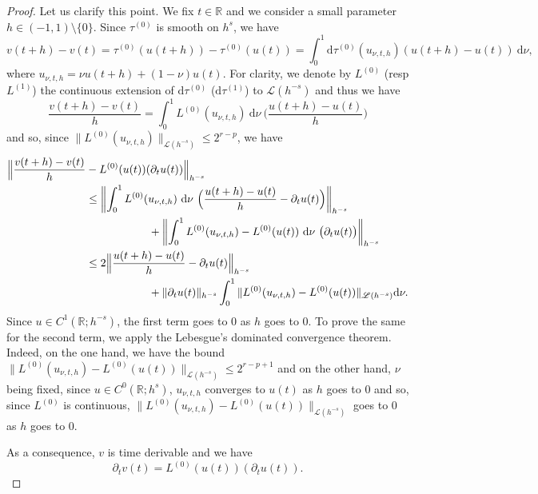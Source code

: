 \documentclass[JEP,XML,SOM,Unicode,NoEqCountersInSection,published]{cedram}
\theoremstyle{definition}
\begin{document}
\begin{proof}
Let us clarify this point. We fix $t\in \mathbb{R}$ and we consider a small parameter $h\in (-1,1)\setminus \{0\}$.
Since $\tau^{(0)}$ is smooth on $h^s$, we have\vspace*{-3pt}
\[
v(t+h)-v(t) = \tau^{(0)}(u(t+h)) - \tau^{(0)}(u(t)) = \int_0^1 \mathrm{d}\tau^{(0)}(u_{\nu,t,h})(u(t+h) - u(t)) \ \mathrm{d}\nu,
\]
where $u_{\nu,t,h} = \nu u(t+h) +(1-\nu) u(t)$. For clarity, we denote by $L^{(0)}$ (resp $L^{(1)}$) the continuous extension of $\mathrm{d}\tau^{(0)}$ (\resp $\mathrm{d}\tau^{(1)}$) to $\mathscr{L}(h^{-s})$ and thus we have\vspace*{-3pt}
\[
\frac{v(t+h)-v(t)}h = \int_0^1 L^{(0)}(u_{\nu,t,h}) \ \mathrm{d}\nu \ \Big(\frac{u(t+h) - u(t)}{h}\Big)
\]
and so, since $ \| L^{(0)}(u_{\nu,t,h}) \|_{\mathscr{L}(h^{-s})}\leq 2^{r-p}$, we have\vspace*{-3pt}
\begin{equation*}
\begin{split}
\Bigl\| \frac{v(t+h)-v(t)}h &- L^{(0)}(u(t))(\partial_t u(t)) \Bigl\|_{h^{-s}} \\
&\leq \biggl\| \int_0^1 L^{(0)}(u_{\nu,t,h}) \ \mathrm{d}\nu \ \Big(\frac{u(t+h) - u(t)}{h} -\partial_t u(t)\Big) \biggl\|_{h^{-s}} \\
&\hspace*{2cm}+ \biggl\| \int_0^1 L^{(0)}(u_{\nu,t,h}) - L^{(0)}(u(t)) \ \mathrm{d}\nu \ \big(\partial_t u(t)\big) \biggl\|_{h^{-s}} \\
&\leq 2 \Big\| \frac{u(t+h) - u(t)}{h} -\partial_t u(t)\Big \|_{h^{-s}} \\ &\hspace*{2cm}+ \| \partial_t u(t) \|_{h^{-s}} \int_0^1 \| L^{(0)}(u_{\nu,t,h}) - L^{(0)}(u(t)) \|_{\mathscr{L}(h^{-s})} \mathrm{d}\nu.
\end{split}
\end{equation*}
Since $u\in C^1(\mathbb{R};h^{-s})$, the first term goes to $0$ as $h$ goes to $0$. To prove the same for the second term, we apply the Lebesgue's dominated convergence theorem. Indeed, on the one hand, we have the bound $ \| L^{(0)}(u_{\nu,t,h}) - L^{(0)}(u(t)) \|_{\mathscr{L}(h^{-s})} \leq 2^{r-p+1}$ and on the other hand, $\nu$ being fixed, since $u\in C^0(\mathbb{R};h^{s})$, $u_{\nu,t,h}$ converges to $u(t)$ as $h$ goes to $0$ and so, since $L^{(0)}$ is continuous, $\| L^{(0)}(u_{\nu,t,h}) - L^{(0)}(u(t)) \|_{\mathscr{L}(h^{-s})}$ goes to $0$ as $h$ goes to $0$.

As a consequence, $v$ is time derivable and we have
\[
\partial_t v(t) = L^{(0)}(u(t))(\partial_t u(t)).
\]


\end{proof}
\end{document}
